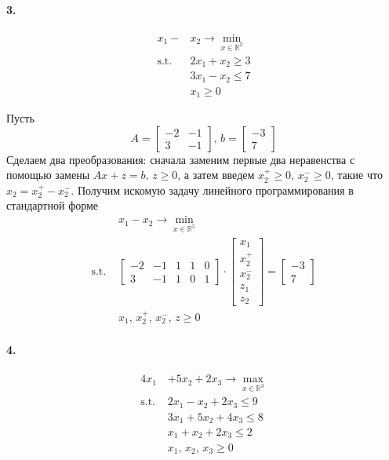 \documentclass{article}
\newcommand*{\R}{\mathbb{R}}
\renewcommand*{\st}{\text{s.t. }}
\newcommand*{\1}{\mathbf{1}}
\begin{document}
\paragraph{3.}
\[ \begin{split}
    x_1 - & x_2 \to \min\limits_{x \in \R^2} \\
    \st & 2x_1 + x_2 \geqslant 3 \\
    & 3x_1 - x_2 \leqslant 7 \\
    & x_1 \geqslant 0
\end{split} \]

\noindent
Пусть
\[ A = \begin{bmatrix}
    -2 & -1 \\ 3 & -1
\end{bmatrix},\, b = \begin{bmatrix}
    -3 \\ 7
\end{bmatrix} \]
Сделаем два преобразования: сначала заменим первые два неравенства с помощью замены $Ax + z = b,\, z \geqslant 0$, а затем введем $x_2^+ \geqslant 0,\,  x_2^- \geqslant 0$, такие что $x_2 = x_2^+ - x_2^-$. Получим искомую задачу линейного программирования в стандартной форме
\[ \begin{split}
    &x_1 - x_2 \to \min\limits_{x \in \R^5} \\
    \st &     \begin{bmatrix}
        -2 & -1 & 1 & 1 & 0 \\ 3 & -1 & 1 & 0 & 1
    \end{bmatrix} \cdot \begin{bmatrix}
        x_1 \\ x_2^+ \\ x_2^- \\ z_1 \\ z_2
    \end{bmatrix} = \begin{bmatrix}
        -3 \\ 7
    \end{bmatrix} \\
    & x_1,\, x_2^+,\, x_2^-,\, z \geqslant 0
\end{split} \]


\paragraph{4.}
\[ \begin{split}
    4x_1 &+ 5x_2 + 2x_3 \to \max\limits_{x \in \R^3} \\
    \st &2x_1 - x_2 + 2x_3 \leqslant 9 \\
    & 3x_1 + 5x_2 + 4x_3 \leqslant 8 \\
    & x_1 + x_2 + 2x_3 \leqslant 2 \\
    & x_1,\, x_2,\, x_3 \geqslant 0
\end{split} \]
\end{document}
